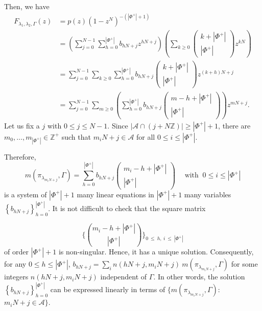 \documentclass[11 pt]{amsart}
\newcommand{\Z}{{\mathbb Z}}
\theoremstyle{definition}
\numberwithin{equation}{section}
\begin{document}
\noindent Then, we have 
\begin{equation*}
\begin{split}
 F_{\lambda_1,\lambda_2,\Gamma} (z) & = p(z) (1-z^{N})^{-(|\Phi^+|+1)} \\
& = \left(\sum_{j=0}^{N-1} \sum_{h=0}^{|\Phi^+|} b_{hN+j} z^{hN+j} \right) \left( \sum_{k \geq0} \left( \begin{matrix} k+ |\Phi^+| \\ |\Phi^+| \end{matrix} \right) z^{kN} \right) \\
& = \sum_{j=0}^{N-1} \sum_{k\geq0} \sum_{h=0}^{|\Phi^+|} b_{hN+j} \left( \begin{matrix} k+ |\Phi^+| \\ |\Phi^+| \end{matrix} \right) z^{(k+h)N +j} \\
& = \sum_{j=0}^{N-1} \sum_{m\geq0} \left( \sum_{h=0}^{|\Phi^+|} b_{hN+j} \left( \begin{matrix} m-h + |\Phi^+| \\ |\Phi^+| \end{matrix} \right) \right) z^{mN+j}.
\end{split}
\end{equation*}
Let us fix a $j$ with $0 \leq j \leq N-1$. Since $|\mathcal{A} \cap (j+N \Z)| \geq |\Phi^+|+1$, there are $m_0,\dots ,m_{|\Phi^+|} \in \Z^+$ such that $m_i N+j \in \mathcal{A}$ for all $0 \leq i \leq |\Phi^+|$.

\noindent Therefore, 
$$ m(\pi_{\lambda_{m_i N +j}},\Gamma) = \sum_{h=0}^{|\Phi^+|} b_{hN+j}  \left( \begin{matrix} m_i - h + |\Phi^+| \\ |\Phi^+| \end{matrix} \right)\hspace{15pt}  \text{with }\ 0 \leq i \leq |\Phi^+| $$ 
is a system of $|\Phi^+| +1$ many linear equations in $|\Phi^+| +1$ many variables $\left\{ b_{hN+j} \right\}_{h=0}^{|\Phi^+|}$. It is not difficult to check that the square matrix 

$$ \Biggl \{ { m_i - h + |\Phi^+ | \choose |\Phi^+| }\Biggr \}  _{0 ~\leq~ h,~ i ~\leq ~|\Phi^+|}$$ of order $|\Phi^+| + 1$ is non-singular. Hence, it has a unique solution. Consequently, for any $0 \leq h \leq |\Phi^+|$, $b_{hN+j}=\sum\limits_i n(hN+j, m_iN+j)\ m(\pi_{\lambda_{m_i N +j}},\Gamma)$ for some integers $n(hN+j, m_iN+j)$ independent of $\Gamma$. In other words, the solution $\left\{ b_{hN+j} \right\}_{h=0}^{|\Phi^+|}$ can be expressed linearly in terms of $\{ m(\pi_{\lambda_{m_i N +j}},\Gamma)$:\ $m_iN+j \in \mathcal{A}\} $.
\end{document}

